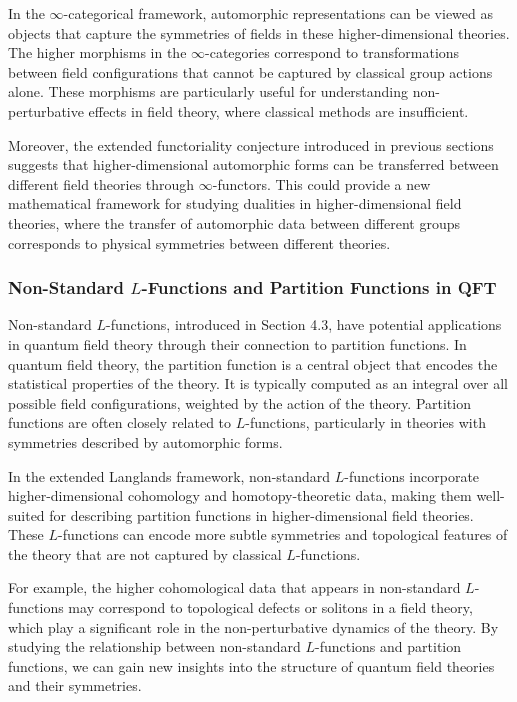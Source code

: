 \documentclass{article}
\theoremstyle{remark}
\begin{document}
In the $\infty$-categorical framework, automorphic representations can be viewed as objects that capture the symmetries of fields in these higher-dimensional theories. The higher morphisms in the $\infty$-categories correspond to transformations between field configurations that cannot be captured by classical group actions alone. These morphisms are particularly useful for understanding non-perturbative effects in field theory, where classical methods are insufficient.

Moreover, the extended functoriality conjecture introduced in previous sections suggests that higher-dimensional automorphic forms can be transferred between different field theories through $\infty$-functors. This could provide a new mathematical framework for studying dualities in higher-dimensional field theories, where the transfer of automorphic data between different groups corresponds to physical symmetries between different theories.

\subsubsection{Non-Standard $L$-Functions and Partition Functions in QFT}

Non-standard $L$-functions, introduced in Section 4.3, have potential applications in quantum field theory through their connection to partition functions. In quantum field theory, the partition function is a central object that encodes the statistical properties of the theory. It is typically computed as an integral over all possible field configurations, weighted by the action of the theory. Partition functions are often closely related to $L$-functions, particularly in theories with symmetries described by automorphic forms.

In the extended Langlands framework, non-standard $L$-functions incorporate higher-dimensional cohomology and homotopy-theoretic data, making them well-suited for describing partition functions in higher-dimensional field theories. These $L$-functions can encode more subtle symmetries and topological features of the theory that are not captured by classical $L$-functions.

For example, the higher cohomological data that appears in non-standard $L$-functions may correspond to topological defects or solitons in a field theory, which play a significant role in the non-perturbative dynamics of the theory. By studying the relationship between non-standard $L$-functions and partition functions, we can gain new insights into the structure of quantum field theories and their symmetries.
\end{document}
